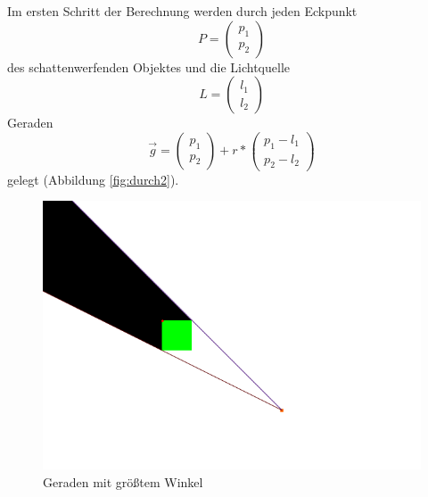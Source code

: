 \documentclass[10pt,twocolumn]{scrartcl}
\begin{document}
Im ersten Schritt der Berechnung werden durch jeden Eckpunkt 
\begin{equation}
	P = \left(\begin{array}{c} p_1 \\ p_2 \end{array}\right)
\end{equation}
des schattenwerfenden Objektes und die Lichtquelle
\begin{equation}
	L = \left(\begin{array}{c} l_1 \\ l_2 \end{array}\right)
\end{equation}
Geraden 
\begin{equation}
	\vec{g} = \left(\begin{array}{c} p_1 \\ p_2 \end{array}\right) + r * \left(\begin{array}{c} p_1 - l_1 \\ p_2 - l_2 \end{array}\right)
\end{equation}
gelegt (Abbildung \ref{fig:durch2}).

\begin{figure}[t]
	\centering
	\includegraphics[width=\columnwidth]{images/durchfuehrung_4.png}
	\caption{Geraden mit größtem Winkel}
	\label{fig:durch3}
\end{figure}

\end{document}
